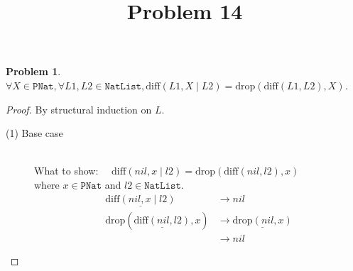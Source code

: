 \documentclass[12pt, a4paper]{article}
\title{Problem 14}
\date{\vspace{-5ex}}
\newtheorem{problem}{Problem}
\newcommand{\rmx}[1]{\mathrm{#1}}
\newcommand{\larrow}{\longrightarrow}
\newcommand{\under}{\underline}
\begin{document}
\maketitle

\begin{problem}
$\forall X \in \mathtt{PNat}, \forall L1, L2 \in \mathtt{NatList}, \rmx{diff}(L1, X \mid L2) = \rmx{drop}(\rmx{diff}(L1, L2), X)$.
\end{problem}
\begin{proof}
By structural induction on $L$.
\begin{description}
\item[(1) Base case]~\\
\noindent
What to show: $\quad \rmx{diff}(nil, x \mid l2) = \rmx{drop}(\rmx{diff}(nil, l2), x)$\\
where $x \in \mathtt{PNat}$ and $l2 \in \mathtt{NatList}$.
\begin{align*}
\under{\rmx{diff}(nil, x \mid l2)} 
	&\larrow nil \tag{by diff1} \\
\rmx{drop}(\under{\rmx{diff}(nil, l2)}, x)
	&\larrow \under{\rmx{drop}(nil, x)} \tag{by diff1} \\
	&\larrow nil \tag{by drop1}
\end{align*}


\end{description}
\end{proof}
\end{document}
